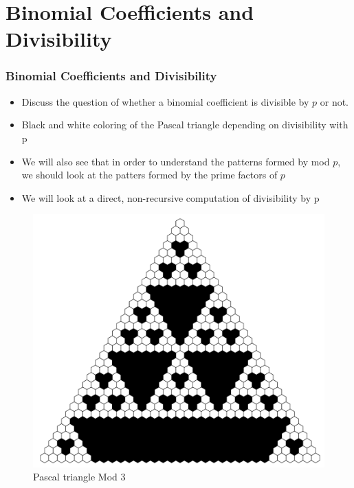 \documentclass{beamer}
\begin{document}
\section{Binomial Coefficients and Divisibility}
\begin{frame}
    \frametitle{Binomial Coefficients and Divisibility}
    \begin{itemize}
        \item Discuss the question of whether a binomial coefficient is divisible by $p$ or not. 
        \item Black and white coloring of the Pascal triangle depending on divisibility with p
        \item We will also see that in order to understand the patterns formed by mod $p$, we should look at the patters formed by the prime factors of $p$ 
        \item We will look at a direct, non-recursive computation of divisibility by p
    \end{itemize}
\end{frame}

\begin{frame}
    \begin{figure}
        \includegraphics[scale=0.36]{PascalMod3.pdf}
        \caption{Pascal triangle Mod 3}
    \end{figure}
\end{frame}
\end{document}
